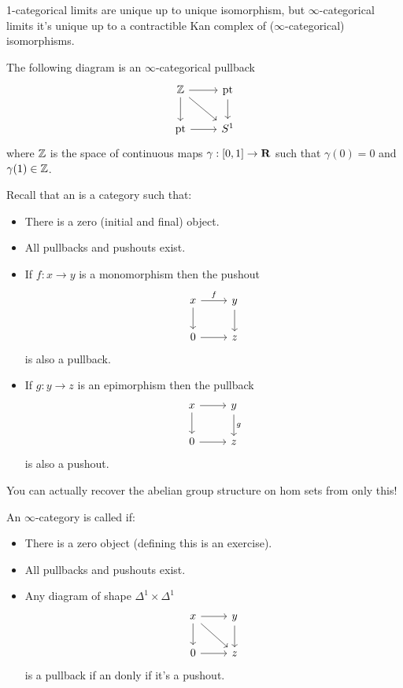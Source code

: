 1-categorical limits are unique up to unique isomorphism, but $\infty$-categorical limits it's unique up to a contractible Kan complex of ($\infty$-categorical) isomorphisms.

\begin{example}
	The following diagram is an $\infty$-categorical pullback
	\[
	\begin{tikzcd}
		\Z \ar[r] \ar[d] \ar[dr] & \text{pt} \ar[d] \\
		\text{pt} \ar[r] & S^{1}
	\end{tikzcd}
	\] 
	where $\mathbb Z$ is the space of continuous maps $\gamma:[0,1]\to \R$ such that $\gamma(0)=0$ and $\gamma(1)\in \mathbb Z$.
\end{example}

Recall that an  is a category such that:
\begin{itemize}
	\item There is a zero (initial and final) object.
	\item All pullbacks and pushouts exist.
	\item If $f:x\to y$ is a monomorphism then the pushout
		\[
		\begin{tikzcd}
			x \ar[r,"f"] \ar[d] & y \ar[d] \\
			0 \ar[r] & z
		\end{tikzcd}
		\] 
		is also a pullback.
	\item If $g:y\to z$ is an epimorphism then the pullback
		\[
		\begin{tikzcd}
			x \ar[r] \ar[d] & y \ar[d,"g"] \\
			0 \ar[r] & z
		\end{tikzcd}
		\] 
		is also a pushout.
\end{itemize}
\begin{remark}
	You can actually recover the abelian group structure on hom sets from only this!
\end{remark}
\begin{definition}
	An $\infty$-category is called  if:
	\begin{itemize}
		\item There is a zero object (defining this is an exercise).
		\item All pullbacks and pushouts exist.
		\item Any diagram of shape $\Delta^{1}\times \Delta^{1}$ 
			\[
			\begin{tikzcd}
				x \ar[r] \ar[dr] \ar[d] & y \ar[d] \\
				0 \ar[r] & z
			\end{tikzcd}
			\] 
			is a pullback if an donly if it's a pushout.
	\end{itemize}
\end{definition}
